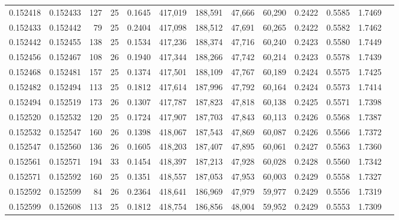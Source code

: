 \begin{tabular}{rrrrrrrrrrrrr}
0.152418 & 0.152433 & 127 &  25 &                                     0.1645 & 417,019 & 188,591 &  47,666 &  60,290 & 0.2422 & 0.5585 & 1.7469 \\
0.152433 & 0.152442 &  79 &  25 &                                     0.2404 & 417,098 & 188,512 &  47,691 &  60,265 & 0.2422 & 0.5582 & 1.7462 \\
0.152442 & 0.152455 & 138 &  25 &                                     0.1534 & 417,236 & 188,374 &  47,716 &  60,240 & 0.2423 & 0.5580 & 1.7449 \\
0.152456 & 0.152467 & 108 &  26 &                                     0.1940 & 417,344 & 188,266 &  47,742 &  60,214 & 0.2423 & 0.5578 & 1.7439 \\
0.152468 & 0.152481 & 157 &  25 &                                     0.1374 & 417,501 & 188,109 &  47,767 &  60,189 & 0.2424 & 0.5575 & 1.7425 \\
0.152482 & 0.152494 & 113 &  25 &                                     0.1812 & 417,614 & 187,996 &  47,792 &  60,164 & 0.2424 & 0.5573 & 1.7414 \\
0.152494 & 0.152519 & 173 &  26 &                                     0.1307 & 417,787 & 187,823 &  47,818 &  60,138 & 0.2425 & 0.5571 & 1.7398 \\
0.152520 & 0.152532 & 120 &  25 &                                     0.1724 & 417,907 & 187,703 &  47,843 &  60,113 & 0.2426 & 0.5568 & 1.7387 \\
0.152532 & 0.152547 & 160 &  26 &                                     0.1398 & 418,067 & 187,543 &  47,869 &  60,087 & 0.2426 & 0.5566 & 1.7372 \\
0.152547 & 0.152560 & 136 &  26 &                                     0.1605 & 418,203 & 187,407 &  47,895 &  60,061 & 0.2427 & 0.5563 & 1.7360 \\
0.152561 & 0.152571 & 194 &  33 &                                     0.1454 & 418,397 & 187,213 &  47,928 &  60,028 & 0.2428 & 0.5560 & 1.7342 \\
0.152571 & 0.152592 & 160 &  25 &                                     0.1351 & 418,557 & 187,053 &  47,953 &  60,003 & 0.2429 & 0.5558 & 1.7327 \\
0.152592 & 0.152599 &  84 &  26 &                                     0.2364 & 418,641 & 186,969 &  47,979 &  59,977 & 0.2429 & 0.5556 & 1.7319 \\
0.152599 & 0.152608 & 113 &  25 &                                     0.1812 & 418,754 & 186,856 &  48,004 &  59,952 & 0.2429 & 0.5553 & 1.7309 \\

\end{tabular}
